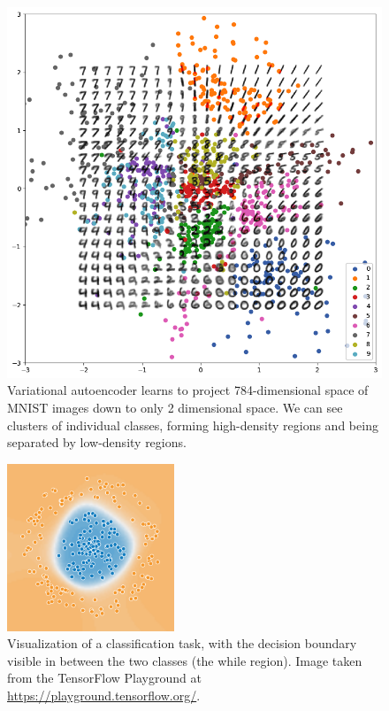 \begin{figure}[p]
    \centering
    \includegraphics[width=140mm]{../img/mnist-manifold.png}
    \caption{Variational autoencoder learns to project 784-dimensional space of MNIST images down to only 2 dimensional space. We can see clusters of individual classes, forming high-density regions and being separated by low-density regions.}
    \label{fig:MnistManifold}
\end{figure}

\begin{figure}[p]
    \centering
    \includegraphics[width=50mm]{../img/decision-boundary.png}
    \caption{Visualization of a classification task, with the decision boundary visible in between the two classes (the while region). Image taken from the TensorFlow Playground at \url{https://playground.tensorflow.org/}.}
    \label{fig:DecisionBoundary}
\end{figure}

